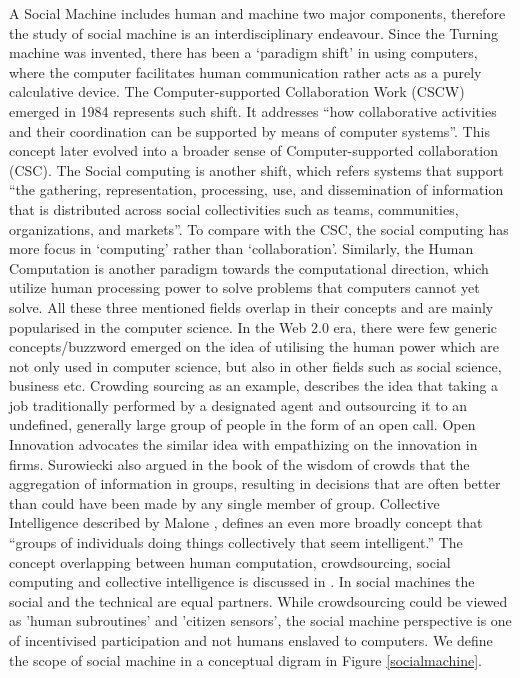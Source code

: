 \documentclass{sig-alternate}
\begin{document}
A Social Machine includes human and machine two major components, therefore the study of social machine is an interdisciplinary endeavour. Since the Turning machine was invented, there has been a `paradigm shift' \cite{kuhn1996structure} in using computers, where the computer facilitates human communication rather acts as a purely calculative device. The Computer-supported Collaboration Work (CSCW) \cite{grudin1994computer} emerged in 1984 represents such shift. It addresses ``how collaborative activities and their coordination can be supported by means of computer systems''. This concept later evolved into a broader sense of  Computer-supported collaboration (CSC). The Social computing \cite{parameswaran2007research} is another shift, which refers systems that support ``the gathering, representation, processing, use, and dissemination of information that is distributed across social collectivities such as teams, communities, organizations, and markets''. To compare with the CSC, the social computing has more focus in `computing' rather than `collaboration'. Similarly, the Human Computation \cite{von2009human} is another paradigm towards the computational direction, which utilize human processing power to solve problems that computers cannot yet solve. All these three mentioned fields overlap in their concepts and are mainly popularised in the computer science. In the Web 2.0 era, there were few generic concepts/buzzword emerged on the idea of utilising the human power which are not only used in computer science, but also in other fields such as social science, business etc. Crowding sourcing \cite{howe2006crowdsourcing} as an example, describes the idea that taking a job traditionally performed by a designated agent and outsourcing it to an undefined, generally large group of people in the form of an open call. Open Innovation \cite{chesbrough2008open} advocates the similar idea with empathizing on the innovation in firms. Surowiecki also argued in the book of the wisdom of crowds \cite{surowiecki2005wisdom} that the aggregation of information in groups, resulting in decisions that are often better than could have been made by any single member of group. Collective Intelligence described by Malone \cite{malone2009harnessing}, defines an even more broadly concept that ``groups of individuals doing things collectively that seem intelligent.'' 
The concept overlapping between human computation, crowdsourcing, social computing and collective intelligence is discussed in \cite{quinn2011human}. 
In  social machines  the  social and  the  technical are equal  partners. While  crowdsourcing  could  be  viewed  as  'human  subroutines'  and  'citizen  sensors',  the social machine perspective is one of incentivised participation and not humans enslaved to computers. We define the scope of social machine in a conceptual digram in Figure \ref{socialmachine}. 
\end{document}
